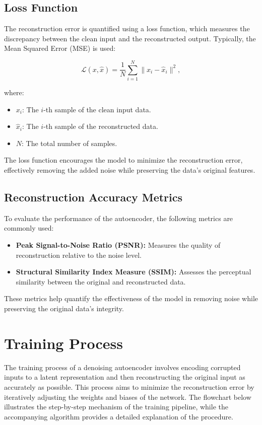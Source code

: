 \documentclass[a4paper,12pt]{article}
\begin{document}
\subsection{Loss Function}
The reconstruction error is quantified using a loss function, which measures the discrepancy between the clean input and the reconstructed output. Typically, the Mean Squared Error (MSE) is used:

\begin{equation}
    \mathcal{L}(x, \hat{x}) = \frac{1}{N} \sum_{i=1}^N \|x_i - \hat{x}_i\|^2,
\end{equation}

where:
\begin{itemize}
    \item $x_i$: The $i$-th sample of the clean input data.
    \item $\hat{x}_i$: The $i$-th sample of the reconstructed data.
    \item $N$: The total number of samples.
\end{itemize}

The loss function encourages the model to minimize the reconstruction error, effectively removing the added noise while preserving the data's original features.

\subsection{Reconstruction Accuracy Metrics}
To evaluate the performance of the autoencoder, the following metrics are commonly used:
\begin{itemize}
    \item \textbf{Peak Signal-to-Noise Ratio (PSNR):} Measures the quality of reconstruction relative to the noise level.
    \item \textbf{Structural Similarity Index Measure (SSIM):} Assesses the perceptual similarity between the original and reconstructed data.
\end{itemize}
These metrics help quantify the effectiveness of the model in removing noise while preserving the original data's integrity.

\section{Training Process}

The training process of a denoising autoencoder involves encoding corrupted inputs to a latent representation and then reconstructing the original input as accurately as possible. This process aims to minimize the reconstruction error by iteratively adjusting the weights and biases of the network. The flowchart below illustrates the step-by-step mechanism of the training pipeline, while the accompanying algorithm provides a detailed explanation of the procedure.\\
\end{document}
